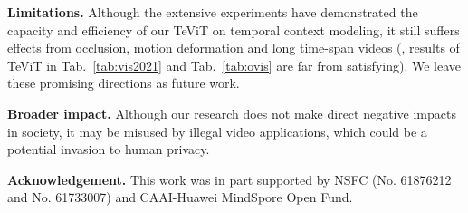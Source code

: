 \documentclass[10pt,twocolumn,letterpaper]{article}
\begin{document}
\noindent\textbf{Limitations.}
Although the extensive experiments have demonstrated the capacity and efficiency of our TeViT on temporal context modeling, it still suffers effects from occlusion, motion deformation and long time-span videos (\ie, results of TeViT in Tab.~\ref{tab:vis2021} and Tab.~\ref{tab:ovis} are far from satisfying). We leave these promising directions as future work.

\noindent\textbf{Broader impact.}
Although our research does not make direct negative impacts in society, it may be misused by illegal video applications, which could be a potential invasion to human privacy.

\noindent\textbf{Acknowledgement.} This work was in part supported by NSFC (No. 61876212 and No. 61733007) and CAAI-Huawei MindSpore Open Fund.

{\small


}
\end{document}
